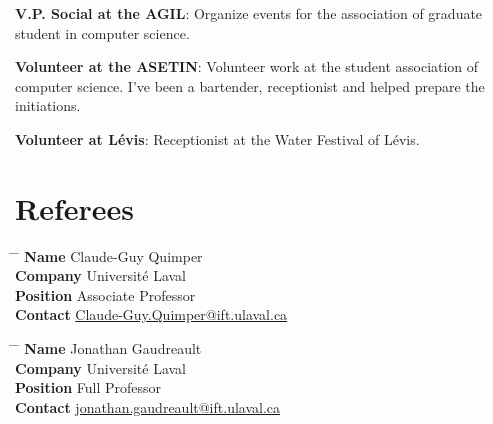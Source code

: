 \documentclass[10pt]{article} %
\begin{document}
\textbf{V.P. Social at the AGIL}: Organize events for the association of graduate student in computer science.

\textbf{Volunteer at the ASETIN}: Volunteer work at the student association of computer science. I've been a bartender, receptionist and helped prepare the initiations.

\textbf{Volunteer at Lévis}: Receptionist at the Water Festival of Lévis.

\section{Referees}

\parbox{0.5\textwidth}{ 
\begin{tabbing}
\hspace{2.75cm} \= \hspace{4cm} \= \kill 
{\bf Name} \> Claude-Guy Quimper \\ 
{\bf Company} \> Université Laval \\ 
{\bf Position} \> Associate Professor \\  
{\bf Contact} \> \href{mailto:Claude-Guy.Quimper@ift.ulaval.ca}{Claude-Guy.Quimper@ift.ulaval.ca} 
\end{tabbing}}
\hfill 
\parbox{0.5\textwidth}{
\begin{tabbing}
\hspace{2.75cm} \= \hspace{4cm} \= \kill
{\bf Name} \> Jonathan Gaudreault\\ 
{\bf Company} \> Université Laval \\ 
{\bf Position} \> Full Professor \\ 
{\bf Contact} \> \href{mailto:jonathan.gaudreault@ift.ulaval.ca}{jonathan.gaudreault@ift.ulaval.ca}
\end{tabbing}}

\end{document}
